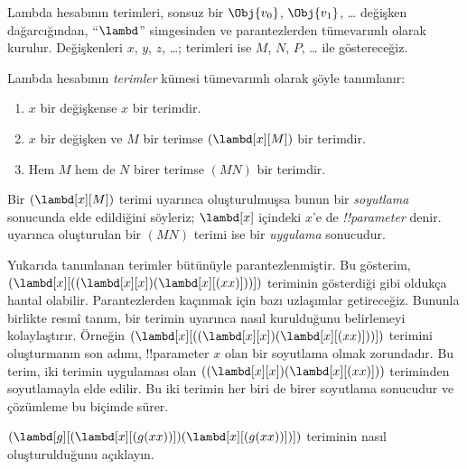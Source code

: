 \documentclass[../../../include/open-logic-section]{subfiles}
\begin{document}

Lambda hesabının terimleri, sonsuz bir $\Obj{v_0}$, $\Obj{v_1}$, \dots{}
değişken dağarcığından, ``$\lambd$'' simgesinden ve parantezlerden
tümevarımlı olarak kurulur. Değişkenleri $x$, $y$, $z$, \dots{}; terimleri
ise $M$, $N$, $P$, \dots{} ile göstereceğiz.

\begin{defn}[Terimler] 
Lambda hesabının \emph{terimler} kümesi tümevarımlı olarak şöyle tanımlanır:
\begin{enumerate}
  \item {} $x$ bir değişkense $x$ bir terimdir.
  \item {} $x$ bir değişken ve $M$ bir terimse
    $(\lambd[x][M])$ bir terimdir.
  \item {} Hem $M$ hem de $N$ birer terimse $(MN)$ bir
    terimdir.
\end{enumerate}
\end{defn}

Bir $(\lambd[x][M])$ terimi  uyarınca oluşturulmuşsa
bunun bir \emph{soyutlama} sonucunda elde edildiğini söyleriz; $\lambd[x]$
içindeki $x$'e de \emph{!!{parameter}} denir.  uyarınca
oluşturulan bir $(MN)$ terimi ise bir \emph{uygulama} sonucudur.

Yukarıda tanımlanan terimler bütünüyle parantezlenmiştir. Bu gösterim,
$(\lambd[x][((\lambd[x][x])(\lambd[x][(xx)]))])$ teriminin gösterdiği gibi
oldukça hantal olabilir. Parantezlerden kaçınmak için bazı uzlaşımlar
getireceğiz. Bununla birlikte resmî tanım, bir terimin 
uyarınca nasıl kurulduğunu belirlemeyi kolaylaştırır. Örneğin
$(\lambd[x][((\lambd[x][x])(\lambd[x][(xx)]))])$ terimini oluşturmanın son
adımı, !!{parameter} $x$ olan bir soyutlama olmak zorundadır. Bu terim,
iki terimin uygulaması olan
$((\lambd[x][x])(\lambd[x][(xx)]))$ teriminden soyutlamayla elde edilir.
Bu iki terimin her biri de birer soyutlama sonucudur ve çözümleme bu biçimde
sürer.

\begin{prob}
$(\lambd[g][(\lambd[x][(g (x x))])
  (\lambd[x][(g (x x))])])$ teriminin nasıl oluşturulduğunu açıklayın.
\end{prob}
\end{document}
